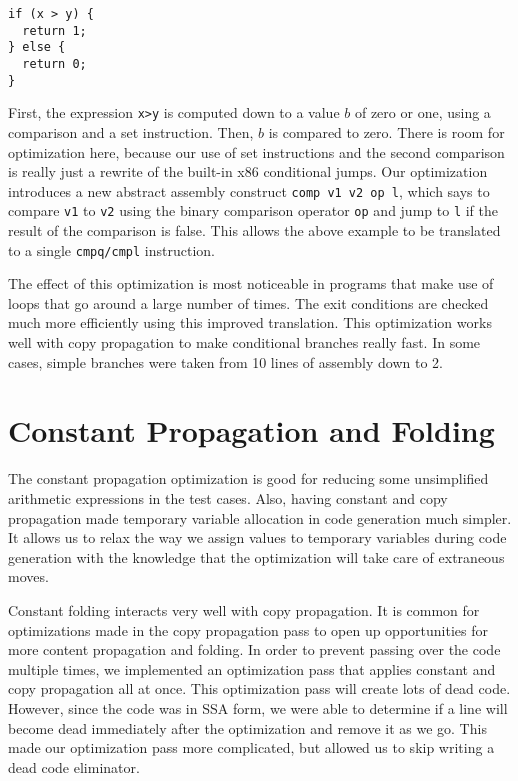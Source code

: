 \documentclass[aps,letterpaper,11pt]{revtex4}
\begin{document}
\begin{verbatim}
if (x > y) {
  return 1;
} else {
  return 0;
}
\end{verbatim}

First, the expression \texttt{x>y} is computed down to a value $b$ of zero or one, using a comparison and a set
instruction. Then, $b$ is compared to zero. There is room for optimization here, because our use of set 
instructions and the second comparison is really just a rewrite of the built-in x86 conditional jumps. Our
optimization introduces a new abstract assembly construct \texttt{comp v1 v2 op l}, which says to compare
\texttt{v1} to \texttt{v2} using the binary comparison operator \texttt{op} and jump to \texttt{l} if the result
of the comparison is false. This allows the above example to be translated to a single \texttt{cmpq/cmpl} 
instruction.

The effect of this optimization is most noticeable in programs that make use of loops that go around a
large number of times. The exit conditions are checked much more efficiently using this improved translation.
This optimization works well with copy propagation to make conditional branches really fast. In some cases,
simple branches were taken from 10 lines of assembly down to 2.

 
\section{Constant Propagation and Folding}

The constant propagation optimization is good for reducing some unsimplified arithmetic expressions in the
test cases. Also, having constant and copy propagation made temporary variable allocation in code generation
much simpler. It allows us to relax the way we assign values to temporary variables during code generation 
with the knowledge that the optimization will take care of extraneous moves.

Constant folding interacts very well with copy propagation. It is common for optimizations made in the 
copy propagation pass to open up opportunities for more content propagation and folding. In order to prevent 
passing over the code multiple times, we implemented an optimization pass that applies constant and copy
propagation all at once. This optimization pass will create lots of dead code. However, since the code was
in SSA form, we were able to determine if a line will become dead immediately after the optimization and
remove it as we go. This made our optimization pass more complicated, but allowed us to skip writing
a dead code eliminator.
\end{document}
